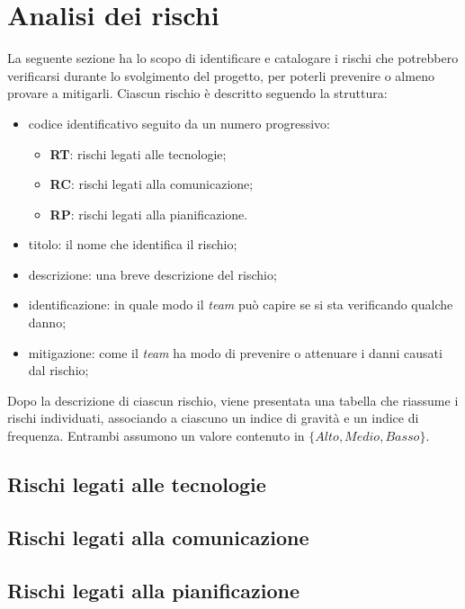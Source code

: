 \section{Analisi dei rischi}

La seguente sezione ha lo scopo di identificare e catalogare i rischi che
potrebbero verificarsi durante lo svolgimento del progetto, per poterli
prevenire o almeno provare a mitigarli.
Ciascun rischio è descritto seguendo la struttura:
\begin{itemize}
	\item codice identificativo seguito da un numero progressivo:
	      \begin{itemize}
		      \item \textbf{RT}: rischi legati alle tecnologie;
		      \item \textbf{RC}: rischi legati alla comunicazione;
		      \item \textbf{RP}: rischi legati alla pianificazione.
	      \end{itemize}

	\item titolo: il nome che identifica il rischio;

	\item descrizione: una breve descrizione del rischio;

	\item identificazione: in quale modo il \textit{team} può capire se si sta
	      verificando qualche danno;

	\item mitigazione: come il \textit{team} ha modo di prevenire o
	      attenuare i danni causati dal rischio;
\end{itemize}

Dopo la descrizione di ciascun rischio, viene presentata una tabella che
riassume i rischi individuati, associando a ciascuno un indice di gravità e un
indice di frequenza. Entrambi assumono un valore contenuto in
$\{Alto, Medio, Basso\}$.


\subsection{Rischi legati alle tecnologie}




\subsection{Rischi legati alla comunicazione}





\subsection{Rischi legati alla pianificazione}
